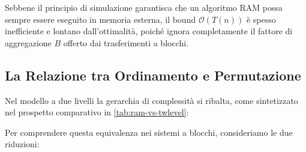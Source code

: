 Sebbene il principio di simulazione garantisca che un algoritmo RAM possa sempre essere eseguito in memoria esterna, il bound $\mathcal{O}(T(n))$ è spesso inefficiente e lontano dall'ottimalità, poiché ignora completamente il fattore di aggregazione $B$ offerto dai trasferimenti a blocchi.

\FloatBarrier
\subsection{La Relazione tra Ordinamento e Permutazione}
\label{subsec:relationship-sort-perm}

Nel modello a due livelli la gerarchia di complessità si ribalta, come sintetizzato nel prospetto comparativo in \autoref{tab:ram-vs-twlevel}:

\begin{table}[H]
  \centering
  \renewcommand{\arraystretch}{1.5}
  \caption{Confronto di complessità asintotica tra RAM e Memoria Esterna.}
  \label{tab:ram-vs-twlevel}
\end{table}

Per comprendere questa equivalenza nei sistemi a blocchi, consideriamo le due riduzioni:

